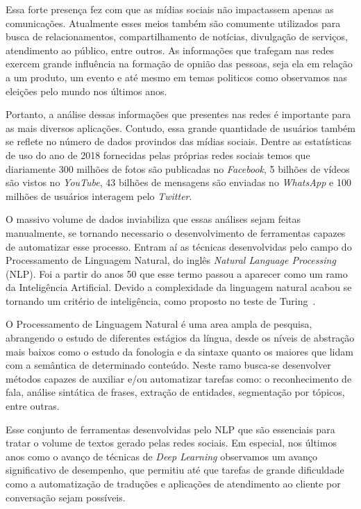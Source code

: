 Essa forte presença fez com que as mídias sociais não impactassem apenas as
comunicações.
Atualmente esses meios também são comumente utilizados para busca de
relacionamentos, compartilhamento de notícias, divulgação de serviços,
atendimento ao público, entre outros.
As informações que trafegam nas redes exercem grande influência na formação de
opnião das pessoas, seja ela em relação a um produto, um evento e até mesmo em
temas politicos como observamos nas eleições pelo mundo nos últimos anos.

Portanto, a análise dessas informações que presentes nas redes é importante para
as mais diversos aplicações.
Contudo, essa grande quantidade de usuários também se reflete no número de dados
provindos das mídias sociais.
Dentre as estatísticas de uso do ano de 2018 fornecidas pelas próprias redes
sociais temos que diariamente 300 milhões de fotos são publicadas no
\textit{Facebook}, 5 bilhões de vídeos são vistos no \textit{YouTube}, 43
bilhões de mensagens são enviadas no \textit{WhatsApp} e 100 milhões de usuários
interagem pelo \textit{Twitter}.

O massivo volume de dados inviabiliza que essas análises sejam feitas
manualmente, se tornando necessario o desenvolvimento de ferramentas capazes de
automatizar esse processo.
Entram aí as técnicas desenvolvidas pelo campo do Processamento de Linguagem
Natural, do inglês \textit{Natural Language Processing} (NLP).
Foi a partir do anos 50 que esse termo passou a aparecer como um ramo da
Inteligência Artificial.
Devido a complexidade da linguagem natural acabou se tornando um critério de
inteligência, como proposto no teste de Turing~\cite{turing50}.

O Processamento de Linguagem Natural é uma area ampla de pesquisa, abrangendo o
estudo de diferentes estágios da língua, desde os níveis de abstração mais
baixos como o estudo da fonologia e da sintaxe quanto os maiores que lidam com a
semântica de determinado conteúdo.
Neste ramo busca-se desenvolver métodos capazes de auxiliar e/ou automatizar
tarefas como: o reconhecimento de fala, análise sintática de frases, extração de
entidades, segmentação por tópicos, entre outras.

Esse conjunto de ferramentas desenvolvidas pelo NLP que são essenciais para
tratar o volume de textos gerado pelas redes sociais.
Em especial, nos últimos anos como o avanço de técnicas de \textit{Deep
Learning} observamos um avanço significativo de desempenho, que permitiu até que
tarefas de grande dificuldade como a automatização de traduções e aplicações de
atendimento ao cliente por conversação sejam possíveis.

